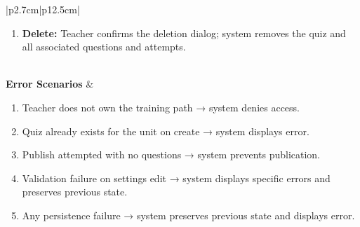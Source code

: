 \begin{table}[H]
\begin{tabular}{|p{2.7cm}|p{12.5cm}|}
\begin{minipage}[t]{\linewidth}
\begin{enumerate}[topsep=0pt,itemsep=1pt,parsep=0pt,partopsep=0pt]
                \item \textbf{Delete:} Teacher confirms the deletion dialog; system removes the quiz and all associated questions and attempts.
            \end{enumerate}
        \end{minipage} \\
        \hline
        \textbf{Error Scenarios} &
        \begin{minipage}[t]{\linewidth}
            \begin{enumerate}[topsep=0pt,itemsep=1pt,parsep=0pt,partopsep=0pt]
                \item Teacher does not own the training path → system denies access.
                \item Quiz already exists for the unit on create → system displays error.
                \item Publish attempted with no questions → system prevents publication.
                \item Validation failure on settings edit → system displays specific errors and preserves previous state.
                \item Any persistence failure → system preserves previous state and displays error.
            \end{enumerate}
        \end{minipage} \\
        \hline
    \end{tabular}
    \label{tab:teacher-manage-quiz}
\end{table}
 
